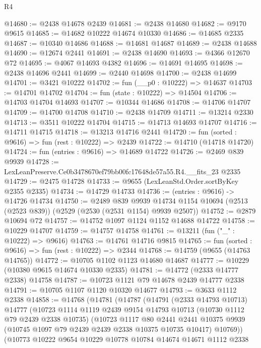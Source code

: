 \begin{lexlean}{R4}
\begin{coremodule}
@14680 := @2438 @14678 @2439
@14681 := @2438 @14680
@14682 := @9170 @9615
@14685 := @14682 @10222 @14674 @10330
@14686 := @14685 @2335
@14687 := @10340 @14686
@14688 := @14681 @14687
@14689 := @2438 @14688
@14690 := @12674 @2441
@14691 := @2438 @14690
@14693 := @4366 @12670 @72
@14695 := @4067 @14693 @4382
@14696 := @14691 @14695
@14698 := @2438 @14696 @2441
@14699 := @2440 @14698
@14700 := @2438 @14699
@14701 := @3421 @10222
@14702 := fun (__p0 : @10222) => @14637
@14703 := @14701 @14702
@14704 := fun (state : @10222) => @14504
@14706 := @14703 @14704 @14693
@14707 := @10344 @14686
@14708 := @14706 @14707
@14709 := @14700 @14708
@14710 := @2438 @14709
@14711 := @13214 @2330
@14713 := @3511 @10222 @14704
@14715 := @14713 @14693 @14707
@14716 := @14711 @14715
@14718 := @13213 @14716 @2441
@14720 := fun (sorted : @9616) => fun (rest : @10222) => @2439
@14722 := @14710 (@14718 @14720)
@14724 := fun (entries : @9616) => @14689 @14722
@14726 := @2469 @839 @9939
@14728 := LexLeanPreserve.Ce0b3478670ef79bb00fc17648de57a55.R4.__fits_23 @2335
@14729 := @2475 @14728
@14733 := @9655 (LexLeanStd.Order.sortByKey @2355 @2335)
@14734 := @14729 @14733
@14736 := (entries : @9616) -> @14726 @14734
@14750 := @2489
    @839
    @9939
    @14734
    @1154
    @10694
    (@2513 (@2523 @839))
    (@2529 (@2530 (@2531 @1154) @9939 @2507))
@14752 := @2879 @10694 @72
@14757 := @14752 @1097 @1124 @1152 @14688 @14722
@14758 := @10229 @14707
@14759 := @14757 @14758
@14761 := @13211 (fun ("_" : @10222) => @9616)
@14763 := @14761 @14716 @9815
@14765 := fun (sorted : @9616) => fun (rest : @10222) => @2344
@14768 := @14759 (@9655 (@14763 @14765))
@14772 := @10705 @1102 @1123 @14680 @14687
@14777 := @10229 (@10380 @9615 @14674 @10330 @2335)
@14781 := @14772 (@2333 @14777 @2338) @14758
@14787 := @10723 @1121 @79 @14678 @2439 @14777 @2338
@14791 := @10705 @1107 @1120 @10320 @14677
@14793 := @3633 @1112 @2338
@14858 := @14768
    (@14781
      (@14787
        (@14791
          (@2333 @14793 @10713)
          @14777
          (@10723
            @1114
            @1119
            @2439
            @9154
            @14793
            @10713
            (@10730 @1112 @79 @2439 @2338 @10735)
            (@10723
              @1117
              @80
              @2441
              @2441
              @10375
              @9939
              (@10745 @1097 @79 @2439 @2439 @2338 @10375 @10735 @10417)
              @10769))
          (@10773
            @10222
            @9654
            @10229
            @10778
            @10784
            @14674
            @14671
            @1112
            @2338

\end{coremodule}
\end{lexlean}
